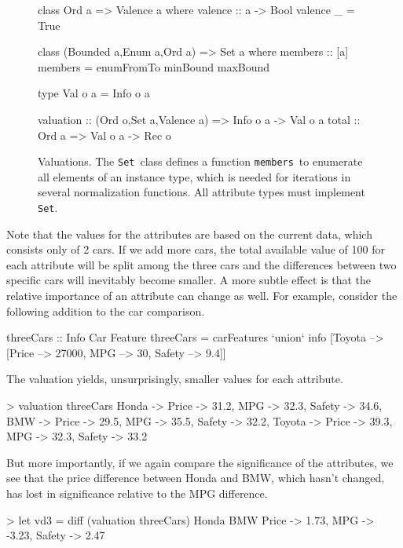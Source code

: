 \documentclass{jfp}
\newcommand{\prg}[2][blue]{\color{#1}\texttt{{\footnotesize #2}}\color{black}}
\begin{document}
\begin{figure}[t]
\begin{haskellcode}
class Ord a => Valence a where
  valence :: a -> Bool
  valence _ = True

class (Bounded a,Enum a,Ord a) => Set a where
  members :: [a]
  members = enumFromTo minBound maxBound

type Val o a = Info o a

valuation :: (Ord o,Set a,Valence a) => Info o a -> Val o a
total     :: Ord a => Val o a -> Rec o
\end{haskellcode}
\caption{Valuations. The \prg{Set}\ class defines a function \prg{members}\ to enumerate all elements of an instance type, which is needed for iterations in several normalization functions. All attribute types must implement \prg{Set}.}
\label{fig:val}
\end{figure}


\noindent
%
Note that the values for the attributes are based on the current data, which consists only of 2 cars. If we add more cars, the total available value of 100 for each attribute will be split among the three cars and the differences between two specific cars will inevitably become smaller. 
%
A more subtle effect is that the relative importance of an attribute can change as well. For example, consider the following addition to the car comparison.

\begin{haskellcode}
threeCars :: Info Car Feature
threeCars = carFeatures `union`
            info [Toyota --> [Price --> 27000, MPG --> 30, Safety --> 9.4]]
\end{haskellcode}

\noindent
%
The valuation yields, unsurprisingly, smaller values for each attribute.

\begin{haskellcode}
> valuation threeCars
{Honda ->  {Price -> 31.2, MPG -> 32.3, Safety -> 34.6},
 BMW ->    {Price -> 29.5, MPG -> 35.5, Safety -> 32.2},
 Toyota -> {Price -> 39.3, MPG -> 32.3, Safety -> 33.2}}
\end{haskellcode}

\noindent
%
But more importantly, if we again compare the significance of the attributes, we see that the price difference between Honda and BMW, which hasn't changed, has lost in significance relative to the MPG difference.

\begin{haskellcode}
> let vd3 = diff (valuation threeCars) Honda BMW
{Price -> 1.73, MPG -> -3.23, Safety -> 2.47}
\end{haskellcode}
\end{document}
